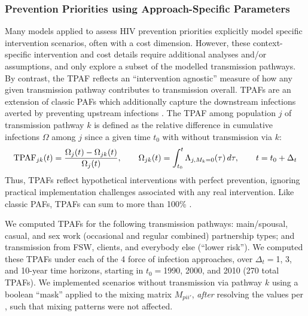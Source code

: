 \subsubsection{Prevention Priorities using Approach-Specific Parameters}\label{foi.exp.mod.tpaf}
Many models applied to assess HIV prevention priorities
explicitly model specific intervention scenarios, often with a cost dimension.
However, these context-specific intervention and cost details
require additional analyses and/or assumptions,
and only explore a subset of the modelled transmission pathways.
By contrast, the TPAF reflects an ``intervention agnostic'' measure of
how any given transmission pathway contributes to transmission overall.
TPAFs are an extension of classic PAFs which additionally capture
the downstream infections averted by preventing upstream infections \cite{Mishra2014tpaf}.
The TPAF among population $j$ of transmission pathway $k$ is defined as
the relative difference in cumulative infections $\Omega$ among $j$ since a given time $t_0$
with \vs without transmission via $k$:
\begin{equation}\label{eq:tpaf}
  \textup{TPAF}_{jk}(t) = \frac{\Omega_{j}(t) - \Omega_{jk} (t)}{\Omega_{j}(t)}
  ,\qquad
  \Omega_{jk}(t) = \int_{t_0}^{t} \Lambda_{j,M_k=0}(\tau)\,d\tau
  ,\qquad
  t = t_0 + \Delta_t
\end{equation}
Thus, TPAFs reflect hypothetical interventions with perfect prevention,
ignoring practical implementation challenges associated with any real intervention.
Like classic PAFs, TPAFs can sum to more than 100\% \cite{Rowe2004,Mishra2021}.
\par
We computed TPAFs for the following transmission pathways:
main/spousal, casual, and sex work (occasional and regular combined) partnership types; and
transmission from FSW, clients, and everybody else (``lower risk'').
We computed these TPAFs under each of the 4 force of infection approaches,
over $\Delta_t = {}$1, 3, and 10-year time horizons,
starting in $t_0 = {}$1990, 2000, and 2010 (270 total TPAFs).
We implemented scenarios without transmission via pathway $k$
using a boolean ``mask'' applied to the mixing matrix $M_{pii'}$,
\emph{after} resolving the values per ,
such that mixing patterns were not affected.
